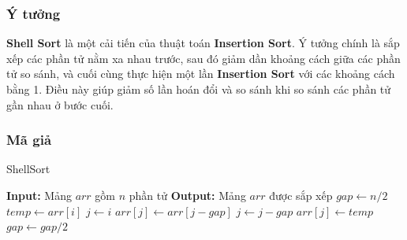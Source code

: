 \subsubsection{Ý tưởng}
\textbf{Shell Sort} là một cải tiến của thuật toán \textbf{Insertion Sort}. Ý tưởng chính là sắp xếp các phần tử nằm xa nhau trước, sau đó giảm dần khoảng cách giữa các phần tử so sánh, và cuối cùng thực hiện một lần \textbf{Insertion Sort} với các khoảng cách bằng 1. Điều này giúp giảm số lần hoán đổi và so sánh khi so sánh các phần tử gần nhau ở bước cuối.\cite{sedgewick1996analysis}

\subsubsection{Mã giả}
\begin{algorithm}[H]
\caption{ShellSort}
\begin{algorithmic}[1]
    \State \textbf{Input:} Mảng $arr$ gồm $n$ phần tử
    \State \textbf{Output:} Mảng $arr$ được sắp xếp
    \State $gap \gets n/2$
            \State $temp \gets arr[i]$
            \State $j \gets i$
                \State $arr[j] \gets arr[j - gap]$
                \State $j \gets j - gap$
            \EndWhile
            \State $arr[j] \gets temp$
        \EndFor
        \State $gap \gets gap / 2$
    \EndWhile
\EndProcedure
\end{algorithmic}
\end{algorithm}
